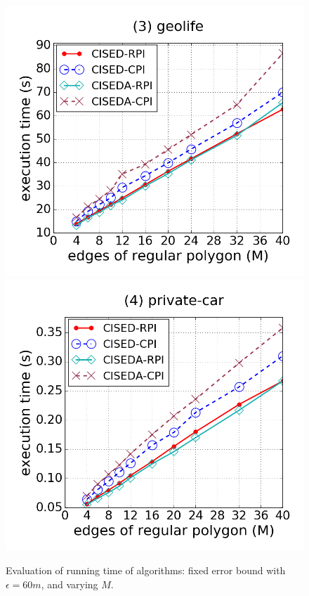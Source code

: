 \begin{figure}[tb!]
\includegraphics[scale = 0.250]{figures/Exp-M-e-60-time-geolife.png}
\includegraphics[scale = 0.250]{figures/Exp-M-e-60-time-private.png}
\vspace{-2ex}
\caption{\small Evaluation of running time of \lsa algorithms: fixed error bound with $\epsilon=60m$, and varying $M$.}
\label{fig:m-time-e20}
\vspace{-2ex}
\end{figure}

